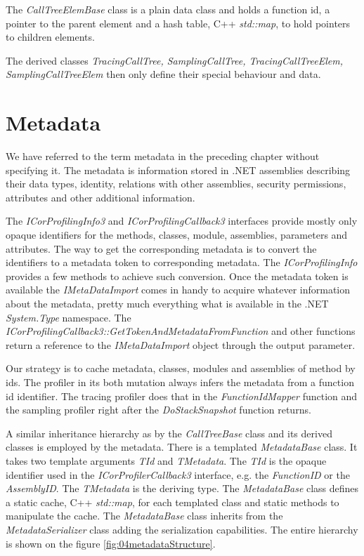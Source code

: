 The \textit{CallTreeElemBase} class is a plain data class and holds a function id, a pointer to the parent element and a hash table, C++ \textit{std::map}, to hold pointers to children elements.

The derived classes \textit{TracingCallTree, SamplingCallTree, TracingCallTreeElem, SamplingCallTreeElem} then only define their special behaviour and data. 

\section{Metadata}
We have referred to the term metadata in the preceding chapter without specifying it. The metadata is information stored in .NET assemblies describing their data types, identity, relations with other assemblies, security permissions, attributes and other additional information.

The \textit{ICorProfilingInfo3} and \textit{ICorProfilingCallback3} interfaces provide mostly only opaque identifiers for the methods, classes, module, assemblies, parameters and attributes. The way to get the corresponding metadata is to convert the identifiers to a metadata token to corresponding metadata. The \textit{ICorProfilingInfo} provides a few methods to achieve such conversion. Once the metadata token is available the \textit{IMetaDataImport} comes in handy \cite{ProfMSDNMetaData} to acquire whatever information about the metadata, pretty much everything what is available in the .NET \textit{System.Type} namespace. The \textit{ICorProfilingCallback3::GetTokenAndMetadataFromFunction} and other functions return a reference to the \textit{IMetaDataImport} object through the output parameter. 

Our strategy is to cache metadata, classes, modules and assemblies of method by ids. The profiler in its both mutation always infers the metadata from a function id identifier. The tracing profiler does that in the \textit{FunctionIdMapper} function and the sampling profiler right after the \textit{DoStackSnapshot} function returns.

A similar inheritance hierarchy as by the \textit{CallTreeBase} class and its derived classes is employed by the metadata. There is a templated \textit{MetadataBase} class. It takes two template arguments \textit{TId} and \textit{TMetadata}. The \textit{TId} is the opaque identifier used in the \textit{ICorProfilerCallback3} interface, e.g. the \textit{FunctionID} or the \textit{AssemblyID}. The \textit{TMetadata} is the deriving type. The \textit{MetadataBase} class defines a static cache, C++ \textit{std::map}, for each templated class and static methods to manipulate the cache. The \textit{MetadataBase} class inherits from the \textit{MetadataSerializer} class adding the serialization capabilities. The entire hierarchy is shown on the figure \ref{fig:04metadataStructure}.

